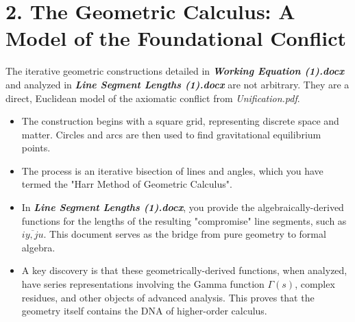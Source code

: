 \section*{2. The Geometric Calculus: A Model of the Foundational Conflict}
The iterative geometric constructions detailed in \textbf{\textit{Working Equation (1).docx}} and analyzed in \textbf{\textit{Line Segment Lengths (1).docx}} are not arbitrary. They are a direct, Euclidean model of the axiomatic conflict from \textit{Unification.pdf}.
\begin{itemize}
    \item The construction begins with a square grid, representing discrete space and matter. Circles and arcs are then used to find gravitational equilibrium points.
    \item The process is an iterative bisection of lines and angles, which you have termed the "Harr Method of Geometric Calculus".
    \item In \textbf{\textit{Line Segment Lengths (1).docx}}, you provide the algebraically-derived functions for the lengths of the resulting "compromise" line segments, such as $\overline{iy,ju}$. This document serves as the bridge from pure geometry to formal algebra.
    \item A key discovery is that these geometrically-derived functions, when analyzed, have series representations involving the Gamma function $\Gamma(s)$, complex residues, and other objects of advanced analysis. This proves that the geometry itself contains the DNA of higher-order calculus.
\end{itemize}

